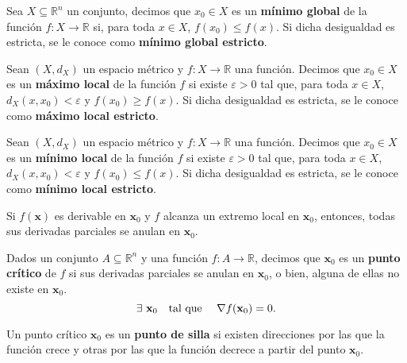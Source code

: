 \documentclass[8pt,a4paper]{extarticle}
\begin{document}
\begin{multicols}{3}
	\begin{boxdef}
		Sea $X \subseteq \mathbb{R}^{n}$ un conjunto, decimos que $x_0 \in X$ es un \textbf{mínimo global} de la función $f : X \to \mathbb{R}$ si, para toda $x \in X$, $f(x_0) \leq f(x)$. Si dicha desigualdad es estricta, se le conoce como \textbf{mínimo global estricto}.
	\end{boxdef}

	\begin{boxdef}
		Sean $(X, d_X)$ un espacio métrico y $f : X \to \mathbb{R}$ una función. Decimos que $x_0 \in X$ es un \textbf{máximo local} de la función $f$ si existe $\varepsilon > 0$ tal que, para toda $x \in X$, $d_X (x, x_0) < \varepsilon$ y $f(x_0) \geq f(x)$. Si dicha desigualdad es estricta, se le conoce como \textbf{máximo local estricto}.
	\end{boxdef}

	\begin{boxdef}
		Sean $(X, d_X)$ un espacio métrico y $f : X \to \mathbb{R}$ una función. Decimos que $x_0 \in X$ es un \textbf{mínimo local} de la función $f$ si existe $\varepsilon > 0$ tal que, para toda $x \in X$, $d_X (x, x_0) < \varepsilon$ y $f(x_0) \leq f(x)$. Si dicha desigualdad es estricta, se le conoce como \textbf{mínimo local estricto}.
	\end{boxdef}

	\begin{boxtheo}
		Si $f(\mathbf{x})$ es derivable en $\mathbf{x}_0$ y $f$ alcanza un extremo local en $\mathbf{x}_0$, entonces, todas sus derivadas parciales se anulan en $\mathbf{x}_0$.
	\end{boxtheo}

	\begin{boxdef}
		Dados un conjunto $A \subseteq \mathbb{R}^n$ y una función $f : A \to \mathbb{R}$, decimos que $\mathbf{x}_0$ es un \textbf{punto crítico} de $f$ si sus derivadas parciales se anulan en $\mathbf{x}_0$, o bien, alguna de ellas no existe en $\mathbf{x}_0$.
		\[\exists\ \mathbf{x}_0 \quad \text{\normalfont tal que} \quad\ \nabla f(\mathbf{x}_0) = 0.\]
	\end{boxdef}

	\begin{boxdef}
		Un punto crítico $\mathbf{x}_0$ es un \textbf{punto de silla} si existen direcciones por las que la función crece y otras por las que la función decrece a partir del punto $\mathbf{x}_0$.
	\end{boxdef}


\end{multicols}
\end{document}
